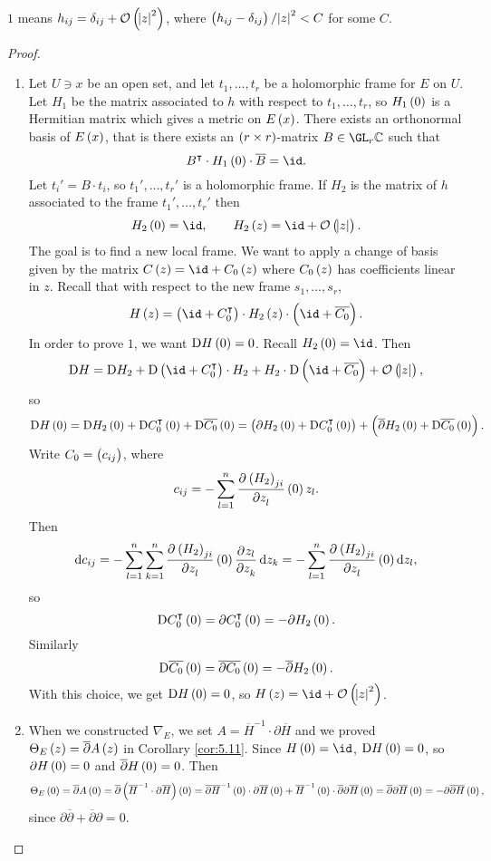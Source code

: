 $ 1 $ means $ h_{ij} = \delta_{ij} + \OOO\br{\abs{z}^2} $, where $ \br{h_{ij} - \delta_{ij}} / \abs{z}^2 < C $ for some $ C $.

\begin{proof}
\hfill
\begin{enumerate}
\item Let $ U \ni x $ be an open set, and let $ t_1, \dots, t_r $ be a holomorphic frame for $ E $ on $ U $. Let $ H_1 $ be the matrix associated to $ h $ with respect to $ t_1, \dots, t_r $, so $ H_1\br{0} $ is a Hermitian matrix which gives a metric on $ E\br{x} $. There exists an orthonormal basis of $ E\br{x} $, that is there exists an $ \br{r \times r} $-matrix $ B \in \GL_r \CC $ such that
$$ B^\intercal \cdot H_1\br{0} \cdot \overline{B} = \id. $$
Let $ t_i' = B \cdot t_i $, so $ t_1', \dots, t_r' $ is a holomorphic frame. If $ H_2 $ is the matrix of $ h $ associated to the frame $ t_1', \dots, t_r' $ then
$$ H_2\br{0} = \id, \qquad H_2\br{z} = \id + \OOO\br{\abs{z}}. $$
The goal is to find a new local frame. We want to apply a change of basis given by the matrix $ C\br{z} = \id + C_0\br{z} $ where $ C_0\br{z} $ has coefficients linear in $ z $. Recall that with respect to the new frame $ s_1, \dots, s_r $,
$$ H\br{z} = \br{\id + C_0^\intercal} \cdot H_2\br{z} \cdot \br{\id + \overline{C_0}}. $$
In order to prove $ 1 $, we want $ \D H\br{0} = 0 $. Recall $ H_2\br{0} = \id $. Then
$$ \D H = \D H_2 + \D\br{\id + C_0^\intercal} \cdot H_2 + H_2 \cdot \D\br{\id + \overline{C_0}} + \OOO\br{\abs{z}}, $$
so
$$ \D H\br{0} = \D H_2\br{0} + \D C_0^\intercal\br{0} + \D\overline{C_0}\br{0} = \br{\partial H_2\br{0} + \D C_0^\intercal\br{0}} + \br{\overline{\partial}H_2\br{0} + \D\overline{C_0}\br{0}}. $$
Write $ C_0 = \br{c_{ij}} $, where
$$ c_{ij} = -\sum_{l = 1}^n \dpd{\br{H_2}_{ji}}{z_l}\br{0}z_l. $$
Then
$$ \d c_{ij} = -\sum_{l = 1}^n \sum_{k = 1}^n \dpd{\br{H_2}_{ji}}{z_l}\br{0}\dpd{z_l}{z_k} \d z_k = -\sum_{l = 1}^n \dpd{\br{H_2}_{ji}}{z_l}\br{0} \d z_l, $$
so
$$ \D C_0^\intercal\br{0} = \partial C_0^\intercal\br{0} = -\partial H_2\br{0}. $$
Similarly
$$ \D\overline{C_0}\br{0} = \overline{\partial}\overline{C_0}\br{0} = -\overline{\partial}H_2\br{0}. $$
With this choice, we get $ \D H\br{0} = 0 $, so $ H\br{z} = \id + \OOO\br{\abs{z}^2} $.


\item When we constructed $ \nabla_E $, we set $ A = \overline{H}^{-1} \cdot \partial\overline{H} $ and we proved $ \Theta_E\br{z} = \overline{\partial}A\br{z} $ in Corollary \ref{cor:5.11}. Since $ H\br{0} = \id $, $ \D H\br{0} = 0 $, so $ \partial H\br{0} = 0 $ and $ \overline{\partial}H\br{0} = 0 $. Then
$$ \Theta_E\br{0} = \overline{\partial}A\br{0} = \overline{\partial}\br{\overline{H}^{-1} \cdot \partial\overline{H}}\br{0} = \overline{\partial}\overline{H}^{-1}\br{0} \cdot \partial\overline{H}\br{0} + \overline{H}^{-1}\br{0} \cdot \overline{\partial}\partial\overline{H}\br{0} = \overline{\partial}\partial\overline{H}\br{0} = -\partial\overline{\partial}\overline{H}\br{0}, $$
since $ \partial\overline{\partial} + \overline{\partial}\partial = 0 $.
\end{enumerate}
\end{proof}

